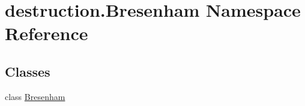 \hypertarget{namespacedestruction_1_1_bresenham}{\section{destruction.\-Bresenham Namespace Reference}
\label{namespacedestruction_1_1_bresenham}
}
\subsection*{Classes}
\begin{DoxyCompactItemize}
\item 
class \hyperlink{classdestruction_1_1_bresenham_1_1_bresenham}{Bresenham}
\end{DoxyCompactItemize}

